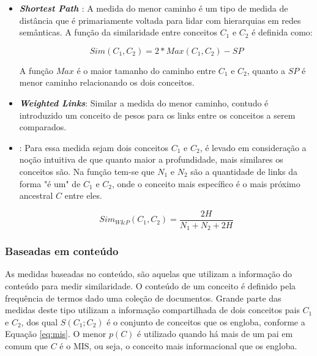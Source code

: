 \begin{itemize}
	\item{\textbf{\textit{Shortest Path} \citep{Rada:1989}}: A medida do menor caminho é um tipo de medida de distância que é primariamente voltada para lidar com hierarquias em redes semânticas. A função da similaridade entre conceitos $C_1$ e $C_2$ é definida como:

	\begin{equation}
		Sim(C_1, C_2) = 2 * Max(C_1, C_2) - SP
	\label{eq:shortest_path}
	\end{equation}

	A função $Max$ é o maior tamanho do caminho entre $C_1$ e $C_2$, quanto a $SP$ é menor caminho relacionando os dois conceitos.}

	\item{\textbf{\textit{Weighted Links}}: Similar a medida do menor caminho, contudo é introduzido um conceito de pesos para os links entre os conceitos a serem comparados.}

	\item{\textbf{\cite{Wu:1994}}: Para essa medida sejam dois conceitos $C_1$ e $C_2$, é levado em consideração a noção intuitiva de que quanto maior a profundidade, mais similares os conceitos são. Na função tem-se que $N_1$ e $N_2$ são a quantidade de links da forma "é um" de $C_1$ e $C_2$, onde o conceito mais específico é o mais próximo ancestral  $C$ entre eles.

	\begin{equation}
		Sim_{W \& P}(C_1, C_2) = \frac{2H}{N_1 + N_2 + 2H}
	\label{eq:wu_palmer}
	\end{equation}	}
\end{itemize}

\subsubsection{Baseadas em conteúdo}

As medidas baseadas no conteúdo, são aquelas que utilizam a informação do conteúdo para medir similaridade. O conteúdo de um conceito é definido pela frequência de termos dado uma coleção de documentos. Grande parte das medidas deste tipo utilizam a informação compartilhada de dois conceitos pais $C_1$ e $C_2$, dos qual $S(C_1; C_2)$ é o conjunto de conceitos que os engloba, conforme a Equação \ref{eq:mis}.  O menor $p(C)$ é utilizado quando há mais de um pai em comum que $C$ é o \ac{MIS}, ou seja, o conceito mais informacional que os engloba.

